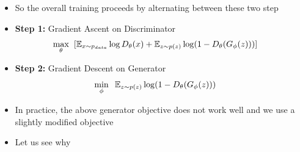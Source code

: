 \begin{frame}
	\begin{columns}
		\begin{overlayarea}{\textwidth}{\textheight}
			\vspace*{10mm}
			\begin{center}
						
			\end{center}		
		\end{overlayarea}

		\begin{overlayarea}{\textwidth}{\textheight}
		
			\begin{itemize}[<+->]
			\item So the overall training proceeds by alternating between these two step
			
			\item \textbf{Step 1:} Gradient Ascent on Discriminator 
				$$ \max\limits_{\theta}\hspace*{2mm} [\mathbb{E}_{x \sim p_{data}} \log D_{\theta}(x)
                \newline
                + \mathbb{E}_{z \sim p(z)} \log(1- D_{\theta}(G_{\phi}(z)) ) ]$$

			\item \textbf{Step 2:} Gradient Descent on Generator
				$$   \min\limits_{\phi}\hspace*{2mm} \mathbb{E}_{z \sim p(z)} \log(1- D_{\theta}(G_{\phi}(z)) )$$
			
			\item In practice, the above generator objective does not work well and we use a slightly modified objective
			\item Let us see why
			\end{itemize}
		\end{overlayarea}
	\end{columns}
\end{frame}

